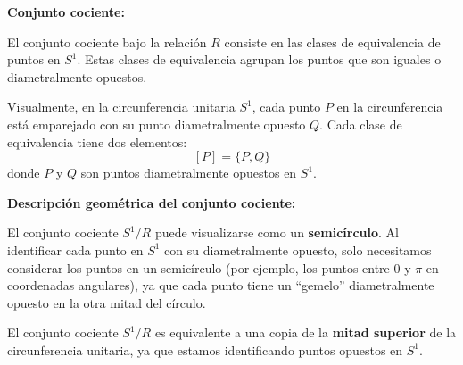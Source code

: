 \begin{solution}
\textbf{Conjunto cociente:}

El conjunto cociente bajo la relación \( R \) consiste en las clases de equivalencia de puntos en \( S^1 \). Estas clases de equivalencia agrupan los puntos que son iguales o diametralmente opuestos.

Visualmente, en la circunferencia unitaria \( S^1 \), cada punto \( P \) en la circunferencia está emparejado con su punto diametralmente opuesto \( Q \). Cada clase de equivalencia tiene dos elementos:
\[
[P] = \{P, Q\}
\]
donde \( P \) y \( Q \) son puntos diametralmente opuestos en \( S^1 \).

\textbf{Descripción geométrica del conjunto cociente:}

El conjunto cociente \( S^1 / R \) puede visualizarse como un \textbf{semicírculo}. Al identificar cada punto en \( S^1 \) con su diametralmente opuesto, solo necesitamos considerar los puntos en un semicírculo (por ejemplo, los puntos entre \( 0 \) y \( \pi \) en coordenadas angulares), ya que cada punto tiene un ``gemelo'' diametralmente opuesto en la otra mitad del círculo.

El conjunto cociente \( S^1 / R \) es equivalente a una copia de la \textbf{mitad superior} de la circunferencia unitaria, ya que estamos identificando puntos opuestos en \( S^1 \).
\end{solution}